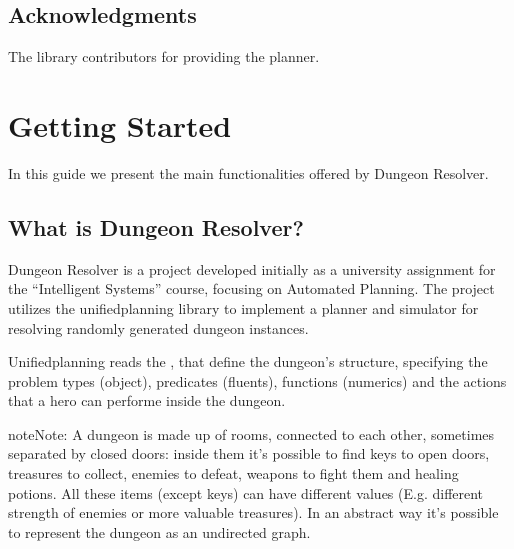 \documentclass[letterpaper,10pt,english]{sphinxmanual}
\begin{document}
\section{Acknowledgments}
\label{\detokenize{index:acknowledgments}}
\sphinxAtStartPar
The  library contributors for providing the planner.

\sphinxstepscope


\chapter{Getting Started}
\label{\detokenize{getting_started:getting-started}}\label{\detokenize{getting_started::doc}}
\sphinxAtStartPar
In this guide we present the main functionalities offered by Dungeon Resolver.

\sphinxstepscope


\section{What is Dungeon Resolver?}
\label{\detokenize{getting_started/whats_dungeon_resolver:what-is-dungeon-resolver}}\label{\detokenize{getting_started/whats_dungeon_resolver::doc}}
\sphinxAtStartPar
Dungeon Resolver is a project developed initially as a university assignment for the “Intelligent Systems” course, focusing on Automated Planning. The project utilizes the unified\sphinxhyphen{}planning library to implement a planner and simulator for resolving randomly generated dungeon instances.

\sphinxAtStartPar
Unified\sphinxhyphen{}planning reads the , that define the dungeon’s structure, specifying the problem types (object), predicates (fluents), functions (numerics) and the actions that a hero can performe inside the dungeon.

\begin{sphinxadmonition}{note}{Note:}
\sphinxAtStartPar
A dungeon is made up of rooms, connected to each other, sometimes separated by closed doors: inside them it’s possible to find keys to open doors, treasures to collect, enemies to defeat, weapons to fight them and healing potions. All these items (except keys) can have different values (E.g. different strength of enemies or more valuable treasures).
In an abstract way it’s possible to represent the dungeon as an undirected graph.
\end{sphinxadmonition}
\end{document}
